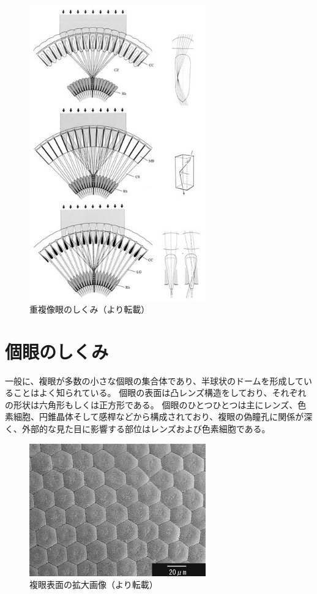 \begin{figure}[hn]
  \centering
  \includegraphics[width=3.0in]{./img/tyoufukuzougan.jpg}
  \caption{重複像眼のしくみ（\cite{arikawa-zougan}より転載）}
  \label{FTyoufuku}
\end{figure}


\section{個眼のしくみ}

一般に、複眼が多数の小さな個眼の集合体であり、半球状のドームを形成していることはよく知られている。
個眼の表面は凸レンズ構造をしており、それぞれの形状は六角形もしくは正方形である。
個眼のひとつひとつは主にレンズ、色素細胞、円錐晶体そして感桿などから構成されており、複眼の偽瞳孔に関係が深く、外部的な見た目に影響する部位はレンズおよび色素細胞である。
\begin{figure}[htbp]
  \centering
  \includegraphics[width=3.0in]{./img/fukugan_kakudai.jpg}
  \caption{複眼表面の拡大画像（\cite{tinycafe}より転載）}
  \label{FFukuganKakudai}
\end{figure}

